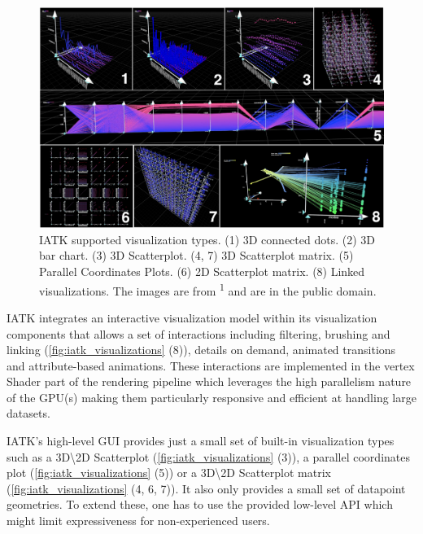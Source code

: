 \documentclass{vgtc}                          %
\begin{document}
\begin{figure}[tb]
	\centering
	\includegraphics[width=\columnwidth]{iatk}
	\caption[Caption for IATK]{IATK supported visualization types. (1) 3D
		connected dots. (2) 3D bar chart. (3) 3D Scatterplot. (4, 7) 3D
		Scatterplot matrix. (5) Parallel Coordinates Plots. (6) 2D Scatterplot
		matrix. (8) Linked visualizations. The images are from \textsuperscript{1}
		and are in the public domain.}
	\label{fig:iatk_visualizations}
\end{figure}


\smallskip

\noindent IATK integrates an interactive visualization model within its
visualization components that allows a set of interactions including filtering,
brushing and linking (\autoref{fig:iatk_visualizations} (8)), details on demand,
animated transitions and attribute-based animations. These interactions are
implemented in the vertex Shader part of the rendering pipeline which leverages
the high parallelism nature of the GPU(s) making them particularly responsive
and efficient at handling large datasets.

\smallskip

\noindent IATK's high-level GUI provides just a small set of built-in visualization
types such as a 3D\textbackslash2D Scatterplot (\autoref{fig:iatk_visualizations}
(3)), a parallel coordinates plot (\autoref{fig:iatk_visualizations} (5)) or a
3D\textbackslash2D Scatterplot matrix (\autoref{fig:iatk_visualizations} (4, 6, 7)).
It also only provides a small set of datapoint geometries. To extend these,
one has to use the provided low-level API which might limit expressiveness for
non-experienced users.

\smallskip
\end{document}
